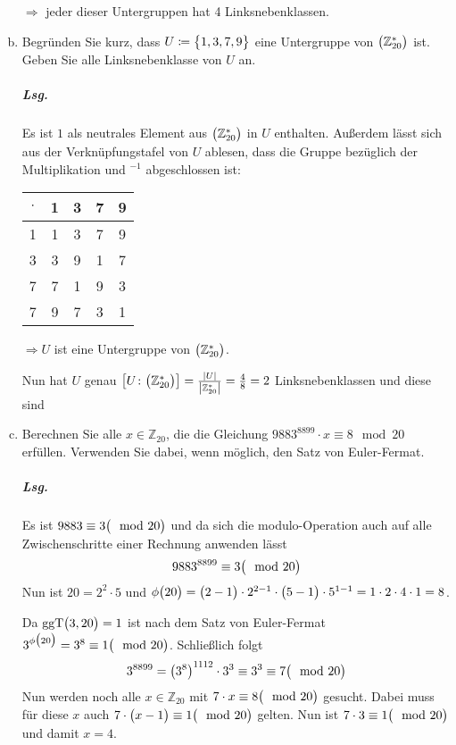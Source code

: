 \documentclass{scrreprt}
\newcommand{\ggT}[0]{\text{ggT}}
\begin{document}
\begin{enumerate}[(a)]
  $\Rightarrow$ jeder dieser Untergruppen hat 4 Linksnebenklassen.

\newpage
\item Begründen Sie kurz, dass $U \coloneq \qty\big{1, 3, 7, 9}$ eine Untergruppe
  von $\qty\big(\mathbb{Z}_{20}^*)$ ist.
  Geben Sie alle Linksnebenklasse von $U$ an.

  \subparagraph{Lsg.} Es ist $1$ als neutrales Element aus
  $\qty\big(\mathbb{Z}_{20}^*)$ in $U$ enthalten.
  Außerdem lässt sich aus der Verknüpfungstafel von $U$ ablesen, dass die
  Gruppe bezüglich der Multiplikation und $^{-1}$ abgeschlossen ist:

  \begin{tabular}{|c|cccc|}
    \hline
    $\cdot$ & 1 & 3 & 7 & 9 \\
    \hline
    1       & 1 & 3 & 7 & 9 \\
    3       & 3 & 9 & 1 & 7 \\
    7       & 7 & 1 & 9 & 3 \\
    7       & 9 & 7 & 3 & 1 \\
    \hline
  \end{tabular}

  $\Rightarrow U$ ist eine Untergruppe von $\qty\big(\mathbb{Z}_{20}^*)$.

  Nun hat $U$ genau $\qty\big[U \colon \qty\big(\mathbb{Z}_{20}^*)]
  = \frac{\abs{U}}{\abs{\mathbb{Z}_{20}^*}}
  = \frac{4}{8} = 2$ Linksnebenklassen und diese sind

\item Berechnen Sie alle $x \in \mathbb{Z}_{20}$, die die Gleichung
  $9883^{8899} \cdot x \equiv 8 \mod 20$ erfüllen.
  Verwenden Sie dabei, wenn möglich, den Satz von Euler-Fermat.

  \subparagraph{Lsg.} Es ist $9883 \equiv 3 \qty\big(\mod 20)$ und da sich die
  modulo-Operation auch auf alle Zwischenschritte einer Rechnung anwenden lässt
  \[
    9883^{8899} \equiv 3 \qty\big(\mod 20)
  \]
  Nun ist $20 = 2^2 \cdot 5$ und $\phi\qty\big(20)
  = \qty\big(2 - 1) \cdot 2^{2 - 1} \cdot \qty\big(5 - 1) \cdot 5^{1 - 1}
  = 1 \cdot 2 \cdot 4 \cdot 1 = 8$.

  Da $\ggT\qty\big(3, 20) = 1$ ist nach dem Satz von Euler-Fermat
  $3^{\phi\qty\big(20)} = 3^8 \equiv 1 \qty\big(\mod 20)$.
  Schließlich folgt
  \[
    3^{8899} = \qty(3^8)^{1112} \cdot 3^3 \equiv 3^3 \equiv 7 \qty\big(\mod 20)
  \]
  Nun werden noch alle $x \in \mathbb{Z}_{20}$ mit
  $7 \cdot x \equiv 8 \qty\big(\mod 20)$ gesucht.
  Dabei muss für diese $x$ auch
  $7 \cdot \qty\big(x - 1) \equiv 1 \qty\big(\mod 20)$ gelten.
  Nun ist $7 \cdot 3 \equiv 1 \qty\big(\mod 20)$ und damit $x = 4$.


\end{enumerate}
\end{document}
